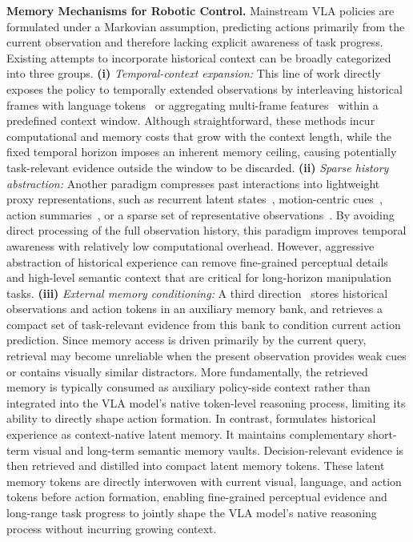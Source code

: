 \noindent\textbf{Memory Mechanisms for Robotic Control.}
Mainstream VLA policies are formulated under a Markovian assumption, predicting actions primarily from the current observation and therefore lacking explicit awareness of task progress. 
Existing attempts to incorporate historical context can be broadly categorized into three groups. 
\textbf{(i)} \emph{Temporal-context expansion:} This line of work directly exposes the policy to temporally extended observations by interleaving historical frames with language tokens~\citep{li2024towards,fan2025interleave} or aggregating multi-frame features~\citep{li2025cronusvla,koo2025hamlet,hu2026resolving} within a predefined context window. 
Although straightforward, these methods incur computational and memory costs that grow with the context length, while the fixed temporal horizon imposes an inherent memory ceiling, causing potentially task-relevant evidence outside the window to be discarded.
\textbf{(ii)} \emph{Sparse history abstraction:} Another paradigm compresses past interactions into lightweight proxy representations, such as recurrent latent states~\citep{li2026remem,li2024vision}, motion-centric cues~\citep{zheng2025tracevla}, action summaries~\citep{bu2025univla}, or a sparse set of representative observations~\citep{mark2026bpp}. By avoiding direct processing of the full observation history, this paradigm improves temporal awareness with relatively low computational overhead. However, aggressive abstraction of historical experience can remove fine-grained perceptual details and high-level semantic context that are critical for long-horizon manipulation tasks.
\textbf{(iii)} \emph{External memory conditioning:} A third direction~\citep{shi2025memoryvla,sridhar2025memer,li2026global} stores historical observations and action tokens in an auxiliary memory bank, and retrieves a compact set of task-relevant evidence from this bank to condition current action prediction. 
Since memory access is driven primarily by the current query, retrieval may become unreliable when the present observation provides weak cues or contains visually similar distractors. 
More fundamentally, the retrieved memory is typically consumed as auxiliary policy-side context rather than integrated into the VLA model's native token-level reasoning process, limiting its ability to directly shape action formation.
In contrast, \ourmethod formulates historical experience as context-native latent memory. It maintains complementary short-term visual and long-term semantic memory vaults. Decision-relevant evidence is then retrieved and distilled into compact latent memory tokens. These latent memory tokens are directly interwoven with current visual, language, and action tokens before action formation, enabling fine-grained perceptual evidence and long-range task progress to jointly shape the VLA model's native reasoning process without incurring growing context.




